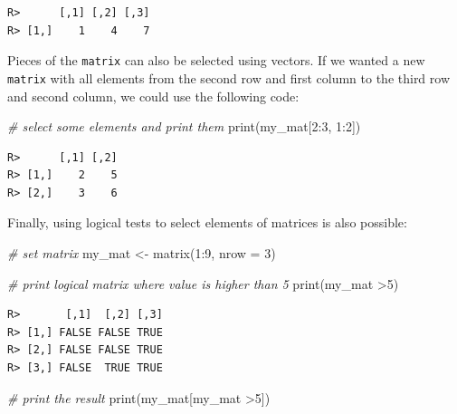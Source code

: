 \documentclass[
  12pt,
]{book}
\newenvironment{Shaded}{\begin{snugshade}}{\end{snugshade}}
\newcommand{\AttributeTok}[1]{\textcolor[rgb]{0.61,0.61,0.61}{#1}}
\newcommand{\CommentTok}[1]{\textcolor[rgb]{0.37,0.37,0.37}{\textit{#1}}}
\newcommand{\DecValTok}[1]{\textcolor[rgb]{0.06,0.06,0.06}{#1}}
\newcommand{\FunctionTok}[1]{\textcolor[rgb]{0,0,0}{#1}}
\newcommand{\NormalTok}[1]{#1}
\newcommand{\OtherTok}[1]{\textcolor[rgb]{0.37,0.37,0.37}{#1}}
\newcommand{\SpecialCharTok}[1]{\textcolor[rgb]{0,0,0}{#1}}
\begin{document}
\begin{verbatim}
R>      [,1] [,2] [,3]
R> [1,]    1    4    7
\end{verbatim}

Pieces of the \texttt{matrix} can also be selected using vectors. If we wanted a new \texttt{matrix} with all elements from the second row and first column to the third row and second column, we could use the following code:

\begin{Shaded}
\begin{Highlighting}[]
\CommentTok{\# select some elements and print them}
\FunctionTok{print}\NormalTok{(my\_mat[}\DecValTok{2}\SpecialCharTok{:}\DecValTok{3}\NormalTok{, }\DecValTok{1}\SpecialCharTok{:}\DecValTok{2}\NormalTok{])}
\end{Highlighting}
\end{Shaded}

\begin{verbatim}
R>      [,1] [,2]
R> [1,]    2    5
R> [2,]    3    6
\end{verbatim}

Finally, using logical tests to select elements of matrices is also possible: 

\begin{Shaded}
\begin{Highlighting}[]
\CommentTok{\# set matrix}
\NormalTok{my\_mat }\OtherTok{\textless{}{-}} \FunctionTok{matrix}\NormalTok{(}\DecValTok{1}\SpecialCharTok{:}\DecValTok{9}\NormalTok{, }\AttributeTok{nrow =} \DecValTok{3}\NormalTok{)}

\CommentTok{\# print logical matrix where value is higher than 5}
\FunctionTok{print}\NormalTok{(my\_mat }\SpecialCharTok{\textgreater{}}\DecValTok{5}\NormalTok{)}
\end{Highlighting}
\end{Shaded}

\begin{verbatim}
R>       [,1]  [,2] [,3]
R> [1,] FALSE FALSE TRUE
R> [2,] FALSE FALSE TRUE
R> [3,] FALSE  TRUE TRUE
\end{verbatim}

\begin{Shaded}
\begin{Highlighting}[]
\CommentTok{\# print the result}
\FunctionTok{print}\NormalTok{(my\_mat[my\_mat }\SpecialCharTok{\textgreater{}}\DecValTok{5}\NormalTok{])}
\end{Highlighting}
\end{Shaded}
\end{document}
